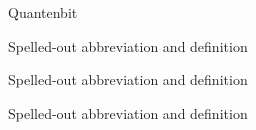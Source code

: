 %
%


\begin{description}[CABR]
\item[Qubit]{Quantenbit}
\item[ABC]{Spelled-out abbreviation and definition}
\item[BABI]{Spelled-out abbreviation and definition}
\item[CABR]{Spelled-out abbreviation and definition}
\end{description}